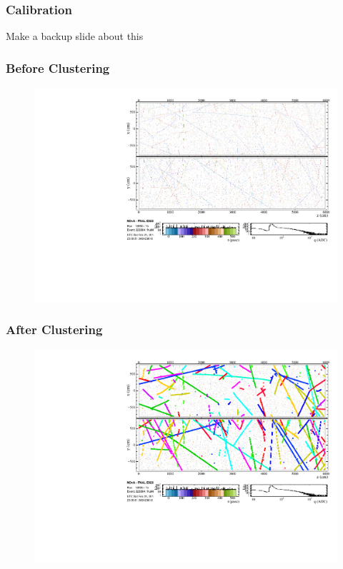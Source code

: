 \documentclass[10pt,professionalfonts,xcolor=table]{beamer}
\begin{document}
\begin{frame}
\frametitle{Calibration}

\bangon
\item Make a backup slide about this
\bangoff
\end{frame}





\frame
{
  \frametitle{Before Clustering}

 \begin{figure} \includegraphics[height=0.9\textwidth, angle=-90]{figures/evd_steps/evd_hits.pdf} \end{figure}
}

\frame
{
  \frametitle{After Clustering}

 \begin{figure} \includegraphics[height=0.9\textwidth, angle=-90]{figures/evd_steps/evd_slice.pdf} \end{figure}
}
\end{document}
